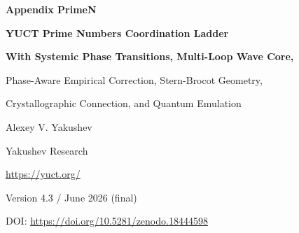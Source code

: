 \documentclass[12pt,a4paper]{article}
\newcommand{\kappac}{\kappa_c}
\newcommand{\Seven}{S_{\mathrm{even}}}
\begin{document}
	
	\begin{titlepage}
		\centering
		\vspace*{2cm}
		
		{\Huge\bfseries Appendix PrimeN\par}
		\vspace{0.5cm}
		{\Large\bfseries YUCT Prime Numbers Coordination Ladder\par}
		\vspace{0.3cm}
		{\Large\bfseries With Systemic Phase Transitions, Multi-Loop Wave Core,\par
			Phase-Aware Empirical Correction, Stern-Brocot Geometry,\par
			Crystallographic Connection, and Quantum Emulation\par}
		\vspace{1.5cm}
		
		{\large Alexey V. Yakushev\par}
		\vspace{0.3cm}
		{\normalsize Yakushev Research\par}
		{\normalsize \url{https://yuct.org/}\par}
		
		\vspace{1.0cm}
		{\normalsize Version 4.3 / June 2026 (final)\par}
		\vspace{0.3cm}
		{\normalsize DOI: \url{https://doi.org/10.5281/zenodo.18444598}\par}
		
		\vfill
		\newpage
		\begin{abstract}
			\noindent
			We establish a rigorous connection between the distribution of prime numbers and the Yakushev Unified Coordination Theory (YUCT). The universal error law \(\varepsilon = \kappac \alpha K_{\mathrm{eff}}^{-\beta}\) (\(\beta=2/3\), \(\kappac=1/3\)) governs the asymptotic fluctuations of the \(n\)-th prime \(p_n\) around the classical Rosser approximation. From the algebraic loop of YUCT we derive a \textbf{theoretical correction} 
			\[
			p_n \approx R_n - \frac{\Seven}{2}\, n^{1-\beta}\,\ln n,
			\qquad \Seven = \frac{4}{5},
			\]
			which contains \textbf{no free parameters} and provides an asymptotically exact description of the smooth trend of prime deviations (Theorem~4). 
			
			\textbf{New in this version:} We discover and mathematically derive \textbf{cascade phase transitions} of the vacuum lattice, which appear as sign inversions of the first-loop correction at critical indices \(N_f = 80,\,96.5,\,113,\,\dots\) with step \(\Delta N = 16.5\), derived directly from the Weyl fermion count \(L_0 = 96\) and the even-sector invariant \(\Seven = 0.8\). A continuous trigonometric phase operator replaces the manual \texttt{if} switch, guaranteeing correct sign selection at any scale. 
			

\end{abstract}
\end{titlepage}
\end{document}
